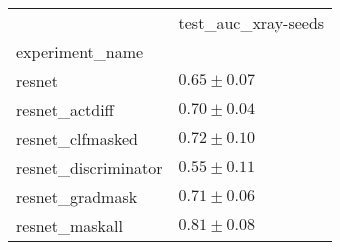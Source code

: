 \begin{tabular}{ll}
\toprule
{} & test_auc_xray-seeds \\
experiment_name      &                     \\
\midrule
resnet               &       $0.65\pm0.07$ \\
resnet_actdiff       &       $0.70\pm0.04$ \\
resnet_clfmasked     &       $0.72\pm0.10$ \\
resnet_discriminator &       $0.55\pm0.11$ \\
resnet_gradmask      &       $0.71\pm0.06$ \\
resnet_maskall       &       $0.81\pm0.08$ \\
\bottomrule
\end{tabular}
